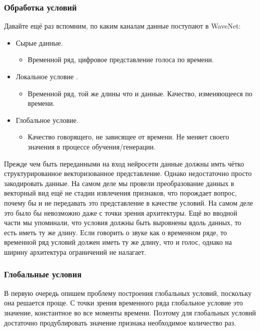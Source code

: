 \documentclass[../diploma.tex]{subfiles}
\begin{document}
    
\newpage    

\subsubsection{Обработка условий}

Давайте ещё  раз вспомним, по каким каналам данные поступают в WaveNet:

\begin{itemize}
    \item Сырые данные.
    \begin{itemize}
        \item Временной ряд, цифровое представление голоса по времени.
    \end{itemize}
    \item Локальное условие .
    \begin{itemize}
        \item Временной ряд, той же длины что и данные. Качество, изменяющееся по времени.
    \end{itemize}
    \item Глобальное условие.
    \begin{itemize}
        \item Качество говорящего, не зависящее от времени. Не меняет своего значения в процессе обучения/генерации.
    \end{itemize}
\end{itemize}


Прежде чем быть переданными на вход нейросети данные должны имть чётко структурированное векторизованное представление. Однако недостаточно просто закодировать данные. На самом деле мы провели преобразование данных в векторный вид ещё не стадии извлечения признаков, что порождает вопрос, почему бы и не передавать это представление в качестве условий.
На самом деле это было бы невозможно даже с точки зрения архитектуры. Ещё во вводной части мы упоминали, что условия должны быть выровнены вдоль данных, то есть иметь ту же длину. Если говорить о звуке как о временном ряде, то временной ряд условий должен иметь ту же длину, что и голос, однако на ширину архитектура ограничений не налагает.

\subsubsection{Глобальные условия}

В первую очередь опишем проблему построения глобальных условий, поскольку она решается проще. С точки зрения временного ряда глобальное условие это значение, константное во все моменты времени. Поэтому для глобальных условий достаточно продублировать значение признака необходимое количество раз.
\end{document}
